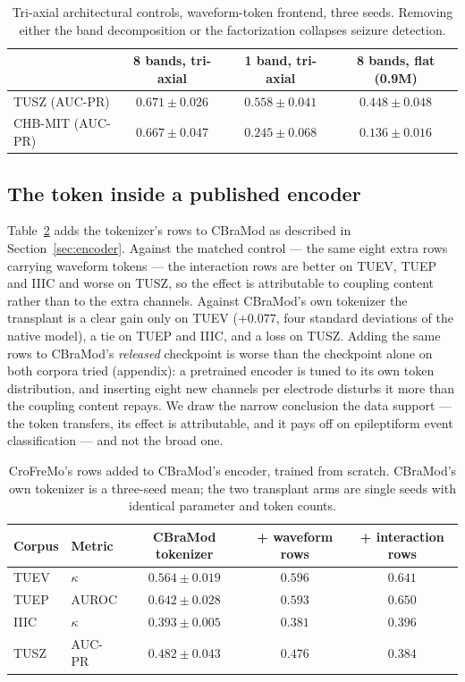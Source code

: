 \begin{table}[t]
\centering
\small
\caption{Tri-axial architectural controls, waveform-token frontend, three
seeds. Removing either the band decomposition or the factorization
collapses seizure detection.}
\label{tab:arch}
\begin{tabular}{lccc}
\toprule
 & 8 bands, tri-axial & 1 band, tri-axial & 8 bands, flat (0.9M) \\
\midrule
TUSZ (AUC-PR) & $0.671 \pm 0.026$ & $0.558 \pm 0.041$ & $0.448 \pm 0.048$ \\
CHB-MIT (AUC-PR) & $0.667 \pm 0.047$ & $0.245 \pm 0.068$ & $0.136 \pm 0.016$ \\
\bottomrule
\end{tabular}
\end{table}

\subsection{The token inside a published encoder}
\label{sec:transplant}

Table~\ref{tab:transplant} adds the tokenizer's rows to CBraMod as
described in Section~\ref{sec:encoder}. Against the matched control ---
the same eight extra rows carrying waveform tokens --- the interaction
rows are better on TUEV, TUEP and IIIC and worse on TUSZ, so the effect is
attributable to coupling content rather than to the extra channels. Against
CBraMod's own tokenizer the transplant is a clear gain only on TUEV
($+0.077$, four standard deviations of the native model), a tie on TUEP
and IIIC, and a loss on TUSZ. Adding the same rows to CBraMod's
\emph{released} checkpoint is worse than the checkpoint alone on both
corpora tried (appendix): a pretrained encoder is tuned to its own token
distribution, and inserting eight new channels per electrode disturbs it
more than the coupling content repays. We draw the narrow conclusion the
data support --- the token transfers, its effect is attributable, and it
pays off on epileptiform event classification --- and not the broad one.

\begin{table}[t]
\centering
\small
\caption{CroFreMo's rows added to CBraMod's encoder, trained from scratch.
CBraMod's own tokenizer is a three-seed mean; the two transplant arms are
single seeds with identical parameter and token counts.}
\label{tab:transplant}
\begin{tabular}{llccc}
\toprule
Corpus & Metric & CBraMod tokenizer & + waveform rows & + interaction rows \\
\midrule
TUEV & $\kappa$ & $0.564 \pm 0.019$ & $0.596$ & $\mathbf{0.641}$ \\
TUEP & AUROC & $0.642 \pm 0.028$ & $0.593$ & $\mathbf{0.650}$ \\
IIIC & $\kappa$ & $0.393 \pm 0.005$ & $0.381$ & $0.396$ \\
TUSZ & AUC-PR & $\mathbf{0.482 \pm 0.043}$ & $0.476$ & $0.384$ \\
\bottomrule
\end{tabular}
\end{table}

